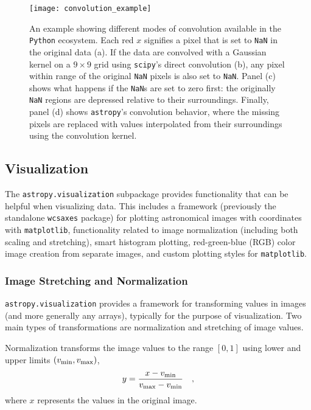 \documentclass[modern]{aastex62}
\newcommand{\package}[1]{\texttt{#1}\xspace}
\newcommand{\python}{\package{Python}}
\newcommand{\astropypkg}{\package{astropy}}
\begin{document}
\begin{figure}
\texttt{[image: convolution\_example]}
\caption{%
    An example showing different modes of convolution available in the \python
    ecosystem.  Each red $x$ signifies a pixel that is set to \texttt{NaN} in the
    original data (a).  If the data are convolved with a Gaussian kernel on a
    $9\times 9$ grid using
    \package{scipy}'s direct convolution (b), any pixel within range of the original \texttt{NaN}
    pixels is also set to \texttt{NaN}.  Panel (c) shows what happens if the
    \texttt{NaN}s are set to zero first: the originally \texttt{NaN} regions are
    depressed relative to their surroundings.  Finally, panel (d) shows
    \astropypkg's convolution behavior, where the missing pixels are replaced
    with values interpolated from their surroundings using the convolution
    kernel.
    \label{fig:convolution-example}
}
\end{figure}


\subsection{Visualization}

The \package{astropy.visualization} subpackage provides functionality that can
be helpful when visualizing data. This includes a framework (previously the
standalone \package{wcsaxes} package) for plotting
astronomical images with coordinates with \package{matplotlib}, functionality related to image
normalization (including both scaling and stretching), smart histogram
plotting, red-green-blue (RGB) color image creation from separate images,
and custom plotting styles for \package{matplotlib}.

\subsubsection{Image Stretching and Normalization}

\label{sec:stretch}

\package{astropy.visualization} provides a framework for transforming values in
images (and more generally any arrays), typically for the purpose of
visualization. Two main types of transformations are normalization and
stretching of image values.

Normalization transforms the image values to the range $[0,1]$ using lower and
upper limits $(v_{\rm min}, v_{\rm max})$,
\begin{equation}
y = \frac{x - v_{\rm min}}{v_{\rm max} - v_{\rm min}} \quad ,
\end{equation}
where $x$ represents the values in the original image.
\end{document}
